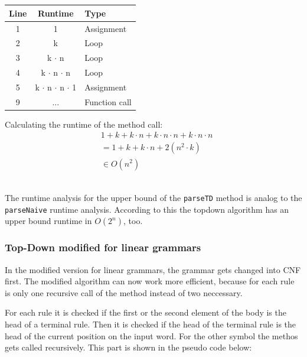 \documentclass[a4paper, 11pt]{article}
\begin{document}
\ \\ \\
\begin{minipage}{0.5\textwidth}

\begin{tabular}{|c|c|l|}
\hline
Line & Runtime & Type \\
\hline
1 &  1 & Assignment \\
2 & k & Loop \\
3 & k $\cdot$ n & Loop \\
4 & k $\cdot$ n $\cdot$ n &  Loop\\
5 & k $\cdot$ n $\cdot$ n $\cdot$ 1 & Assignment\\
9 & ... & Function call\\
\hline
\end{tabular}


\end{minipage}\begin{minipage}{0.5\textwidth}
Calculating the runtime of the method call:
\begin{align*}
& 1 + k + k \cdot n + k \cdot n \cdot n + k \cdot n \cdot n \\
& = 1 + k + k \cdot n + 2(n^2 \cdot k) \\
& \in O(n^2)
\end{align*}
\end{minipage}
\ \\

The runtime analysis for the upper bound of the \texttt{parseTD} method is analog to the \texttt{parseNaive} runtime analysis. According to this the topdown algorithm has an upper bound runtime in $O(2^n)$, too.



\subsubsection{Top-Down modified for linear grammars}
\label{lineartopdown}

In the modified version for linear grammars, the grammar gets changed into CNF first. The modified algorithm can now work more efficient, because for each rule is only one recursive call of the method instead of two neccessary.

For each rule it is checked if the first or the second element of the body is the head of a terminal rule. Then it is checked if the head of the terminal rule is the head of the current position on the input word. For the other symbol the methos gets called recursively. This part is shown in the pseudo code below:
\end{document}
